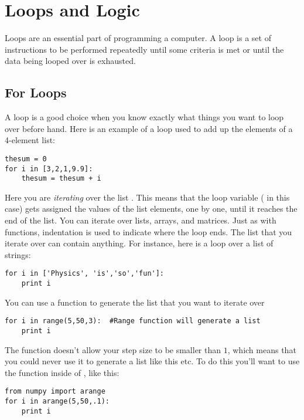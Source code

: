 \chapter{Loops and Logic}
\label{chap:LoopsLogic}

Loops are an essential part of programming a computer. A loop is a set
of instructions to be performed repeatedly until some criteria is met
or until the data being looped over is exhausted.

\section{For Loops}
A  loop is a good choice when you know exactly what things you want
to loop over before hand.  Here is an example of a  loop
used to add up the elements of a 4-element list:
\begin{Verbatim}
thesum = 0
for i in [3,2,1,9.9]:
    thesum = thesum + i
\end{Verbatim}
Here you are {\it iterating} over the list \code{[3,2,1,9.9]}.  This
means that the loop variable ( in this case) gets assigned
the values of the list elements, one by one, until it reaches the end
of the list.  You can iterate over lists, arrays, and
matrices.  Just as with functions, indentation is used to indicate
where the loop ends.    The list
that you iterate over can contain anything.  For instance, here is a loop over a list of
strings:
\begin{Verbatim}
for i in ['Physics', 'is','so','fun']:
    print i
\end{Verbatim}
You can use a function to generate the list that you want to iterate
over
\begin{Verbatim}
for i in range(5,50,3):  #Range function will generate a list
    print i
\end{Verbatim}
The  function doesn't allow your step size to be smaller
than $1$, which means that you could never use it to generate a list
like this  etc.  To do this you'll want to use the
 function inside of , like this:
\begin{Verbatim}
from numpy import arange
for i in arange(5,50,.1):
    print i
\end{Verbatim}
